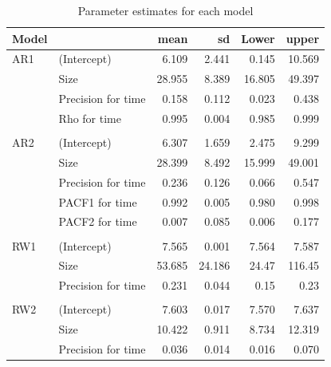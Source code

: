 \documentclass[10pt,letterpaper]{article}
\begin{document}
\begin{table}[h]
	
	\caption{\label{tab:parest}Parameter estimates for each model}
	\centering
	\begin{tabular}[t]{l|l|r|r|r|r}
		\hline
		Model& & mean & sd & Lower & upper\\
		\hline
		AR1&(Intercept) & 6.109 & 2.441 & 0.145 & 10.569\\
		&Size & 28.955 & 8.389 & 16.805 & 49.397\\
		&Precision for time & 0.158 & 0.112 & 0.023 & 0.438\\
		&Rho for time & 0.995 & 0.004 & 0.985 & 0.999\\
		\hline
		& &  &  &  & \\
		AR2&(Intercept) & 6.307 & 1.659 & 2.475 & 9.299\\
		&Size & 28.399 & 8.492 & 15.999 & 49.001\\
		&Precision for time & 0.236 & 0.126 & 0.066 & 0.547\\
		&PACF1 for time & 0.992 & 0.005 & 0.980 & 0.998\\
		&PACF2 for time & 0.007 & 0.085 & 0.006 & 0.177\\
		\hline
		& &  &  &  & \\
		RW1 & (Intercept) & 7.565 & 0.001 & 7.564 & 7.587\\
		& Size & 53.685 & 24.186 & 24.47 & 116.45\\
		& Precision for time & 0.231 & 0.044 & 0.15 & 0.23\\
		\hline
		& &  &  &  & \\
		RW2 & (Intercept) & 7.603 & 0.017 & 7.570 & 7.637\\
		& Size & 10.422 & 0.911 & 8.734 & 12.319\\
		& Precision for time & 0.036 & 0.014 & 0.016 & 0.070\\
		\hline
	\end{tabular}
\end{table}
\end{document}
